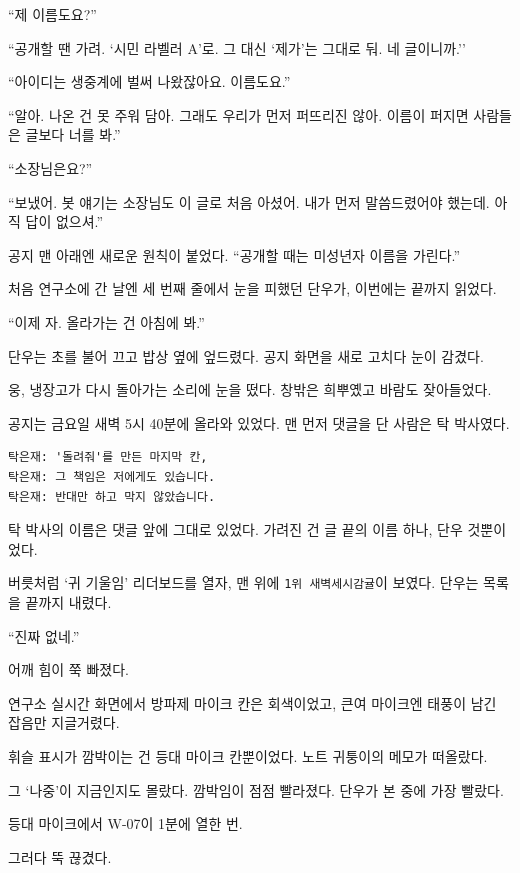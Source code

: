 \documentclass[
  korean,
  letterpaper,
  twoside,
  open=any,
  fontsize=12.5pt,
  headings=small]{scrbook}
\newcommand{\logfont}{\linespread{1}\fontsize{10.8}{15.2}\selectfont}
\newcommand{\dateline}[1]{\par\noindent{\sffamily\small\color{gray}#1}\par\medskip}
\begin{document}
``제 이름도요?''

``공개할 땐 가려. `시민 라벨러
A'로. 그 대신 `제가'는 그대로
둬. 네 글이니까.''

``아이디는 생중계에 벌써
나왔잖아요. 이름도요.''

``알아. 나온 건 못 주워 담아.
그래도 우리가 먼저 퍼뜨리진
않아. 이름이 퍼지면 사람들은
글보다 너를 봐.''

``소장님은요?''

``보냈어. 봇 얘기는 소장님도
이 글로 처음 아셨어. 내가 먼저
말씀드렸어야 했는데. 아직 답이
없으셔.''

공지 맨 아래엔 새로운 원칙이
붙었다. ``공개할 때는 미성년자
이름을 가린다.''

처음 연구소에 간 날엔 세 번째
줄에서 눈을 피했던 단우가,
이번에는 끝까지 읽었다.

``이제 자. 올라가는 건 아침에
봐.''

단우는 초를 불어 끄고 밥상
옆에 엎드렸다. 공지 화면을
새로 고치다 눈이 감겼다.

웅, 냉장고가 다시 돌아가는
소리에 눈을 떴다. 창밖은
희뿌옜고 바람도 잦아들었다.

공지는 금요일 새벽 5시 40분에
올라와 있었다. 맨 먼저 댓글을
단 사람은 탁 박사였다.

\begin{Verbatim}[samepage=true,frame=single,framesep=2.5mm,rulecolor=\color{gray},formatcom=\logfont]
탁은재: '돌려줘'를 만든 마지막 칸,
탁은재: 그 책임은 저에게도 있습니다.
탁은재: 반대만 하고 막지 않았습니다.
\end{Verbatim}

탁 박사의 이름은 댓글 앞에
그대로 있었다. 가려진 건 글
끝의 이름 하나, 단우
것뿐이었다.

버릇처럼 `귀 기울임'
리더보드를 열자, 맨 위에
\texttt{1위\ 새벽세시감귤}이
보였다. 단우는 목록을 끝까지
내렸다.

``진짜 없네.''

어깨 힘이 쭉 빠졌다.

연구소 실시간 화면에서 방파제
마이크 칸은 회색이었고, 큰여
마이크엔 태풍이 남긴 잡음만
지글거렸다.

휘슬 표시가 깜박이는 건 등대
마이크 칸뿐이었다. 노트
귀퉁이의 메모가 떠올랐다.

\dateline{등대 쪽만? 나중에}

그 `나중'이 지금인지도 몰랐다.
깜박임이 점점 빨라졌다. 단우가
본 중에 가장 빨랐다.

등대 마이크에서 W-07이 1분에
열한 번.

그러다 뚝 끊겼다.
\end{document}
